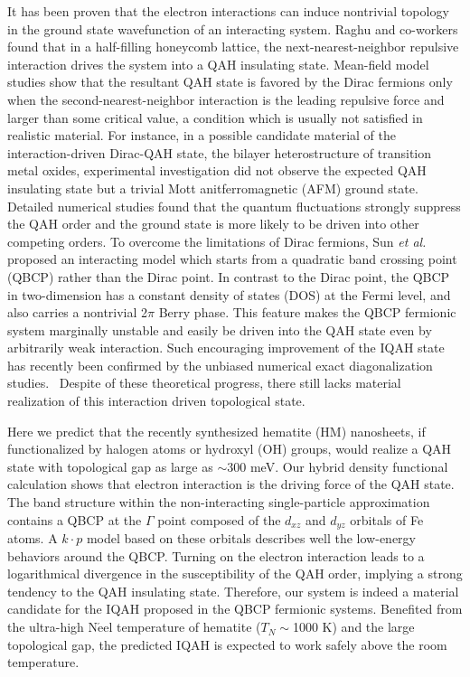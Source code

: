 \documentclass[twocolumn,english,prb,showpacs]{revtex4-1}
\begin{document}
It has been proven that the electron interactions can induce nontrivial topology in the ground state wavefunction of an interacting system. Raghu and co-workers \cite{Raghu2008PRL} found that in a half-filling honeycomb lattice, the next-nearest-neighbor repulsive interaction drives the system into a QAH insulating state. Mean-field model studies show that the resultant QAH state is favored by the Dirac fermions only when the second-nearest-neighbor interaction is the leading repulsive force and larger than some critical value, a condition which is usually not satisfied in realistic material. For instance, in a possible candidate material of the interaction-driven Dirac-QAH state\cite{Xiao2011Interface,LQF_NJP,XiDai2014PRB}, the bilayer heterostructure of transition metal oxides, experimental investigation did not observe the expected QAH insulating state but a trivial Mott anitferromagnetic (AFM) ground state\cite{BL111PRL}. Detailed numerical studies found that the quantum fluctuations strongly suppress the QAH order and the ground state is more likely to be driven into other competing orders\cite{MotrukPRB}. To overcome the limitations of Dirac fermions, Sun \textit{et al.} \cite{SunKai_PRL} proposed an interacting model which starts from a quadratic band crossing point (QBCP) rather than the Dirac point. In contrast to the Dirac point, the QBCP in two-dimension has a constant density of states (DOS) at the Fermi level, and also carries a nontrivial 2$\pi$ Berry phase. This feature makes the QBCP fermionic system marginally unstable and easily be driven into the QAH state even by arbitrarily weak interaction.\cite{XiDai2014PRB,RueggPRB} Such encouraging improvement of the IQAH state has recently been confirmed by the unbiased numerical exact diagonalization studies.~\cite{Zhu2016Interaction, Wu2016Diagnosis} Despite of these theoretical progress, there still lacks material realization of this interaction driven topological state.

Here we predict that the recently synthesized hematite (HM) nanosheets,\cite{WXHMNS} if functionalized by halogen atoms or hydroxyl (OH) groups, would realize a QAH state with topological gap as large as $\sim$300 meV. Our hybrid density functional calculation shows that electron interaction is the driving force of the QAH state. {The band structure within the non-interacting single-particle approximation contains a QBCP at the $\Gamma$ point composed of the $d_{xz}$ and $d_{yz}$ orbitals of Fe atoms. A $k\cdot p$ model based on these orbitals describes well the low-energy behaviors around the QBCP.} Turning on the electron interaction leads to a logarithmical divergence in the susceptibility of the QAH order, implying a strong tendency to the QAH insulating state. Therefore, our system is indeed a material candidate for the IQAH proposed in the QBCP fermionic systems.\cite{SunKai_PRL} Benefited from the ultra-high N$\acute{\text{e}}$el temperature of hematite ($T_{N}\sim$1000 K) and the large topological gap, the predicted IQAH is expected to work safely above the room temperature.
\end{document}
